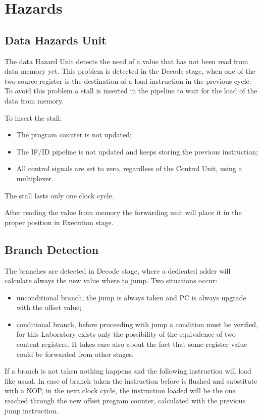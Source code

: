 %
\chapter{Hazards}
\label{cha4}

\section{Data Hazards Unit}

The data Hazard Unit detects the need of a value that has not been read from 
data memory yet. This problem is detected in the Decode stage, when one of the 
two source register is the destination of a load instruction in the previous cycle. 
To avoid this problem a stall is inserted in the pipeline to wait for the load of the data 
from memory. 

To insert the stall:
\begin{itemize}
    \item The program counter is not updated;
    \item The IF/ID pipeline is not updated and keeps storing the previous instruction;
    \item All control signals are set to zero, regardless of the Control Unit, using a multiplexer.
\end{itemize}
The stall lasts only one clock cycle.

After reading the value from memory the forwarding unit will place it in the proper 
position in Execution stage.

\section{Branch Detection}

The branches are detected in Decode stage, where a dedicated adder will calculate always the new value where to jump.
Two situations occur:
\begin{itemize}
    \item unconditional branch, the jump is always taken and PC is always upgrade with the offset value;
    \item conditional branch, before proceeding with jump a condition must be verified, for this Laboratory
     exists only the possibility of the equivalence of two content registers. It takes care also about the fact that
     some register value could be forwarded from other stages. 
\end{itemize}

If a branch is not taken nothing happens and the following instruction will load like usual. 
In case of branch taken the instruction before is flushed and substitute with a NOP, 
in the next clock cycle, the instruction loaded will be the 
one reached through the new offset program counter, calculated with the previous jump instruction.

